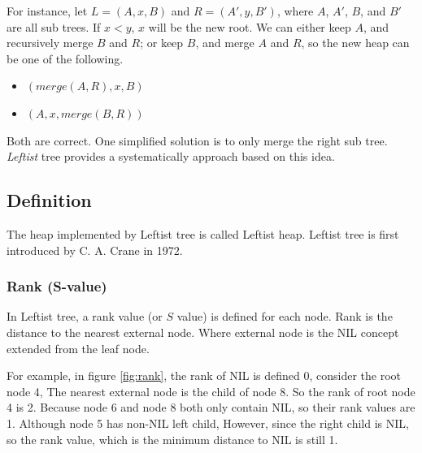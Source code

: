 \documentclass[b5paper]{article}
\begin{document}
For instance, let $L = (A, x, B)$ and $R = (A', y, B')$, where $A$, $A'$, $B$,
and $B'$ are all sub trees. If $x < y$, $x$ will be the new root.
We can either keep $A$, and recursively merge $B$ and $R$; or
keep $B$, and merge $A$ and $R$, so the new heap can be one
of the following.

\begin{itemize}
\item $(merge(A, R), x, B)$
\item $(A, x, merge(B, R))$
\end{itemize}

Both are correct. One simplified solution is to only merge the right
sub tree. {\em Leftist} tree provides a systematically approach based on this
idea.

\subsection{Definition}

The heap implemented by Leftist tree is called Leftist heap. Leftist
tree is first introduced by C. A. Crane in 1972\cite{wiki-leftist-tree}.

\subsubsection{Rank (S-value)}

In Leftist tree, a rank value (or $S$ value) is defined for each node.
Rank is the distance to the nearest external node. Where external node
is the NIL concept extended from the leaf node.

For example, in figure \ref{fig:rank}, the rank of NIL
is defined 0, consider the root node 4, The nearest external node is
the child of node 8. So the rank of root node 4 is 2. Because node
6 and node 8 both only contain NIL, so their rank values are 1.
Although node 5 has non-NIL left child, However, since the right
child is NIL, so the rank value, which is the minimum distance
to NIL is still 1.
\end{document}
